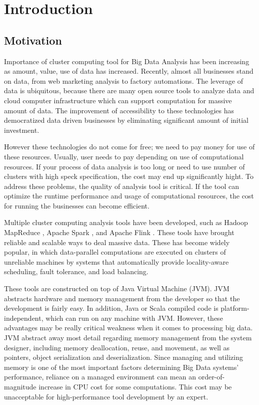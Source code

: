\chapter{Introduction}
\label{chapter:Introduction}
\thispagestyle{myheadings}


\section{Motivation}
\label{sec:motivation}
Importance of cluster computing tool for Big Data Analysis has been increasing as amount, value, use of data has increased. 
Recently, almost all businesses stand on data, from web marketing analysis to factory automations. The leverage of data is ubiquitous, because 
there are many open source tools to analyze data and cloud computer infrastructure which can support computation for massive amount of data. 
The improvement of accessibility to these technologies has democratized data driven businesses by 
eliminating significant amount of initial investment. 

However these technologies do not come for free; we need to pay money for use of these resources. Usually, user needs to pay depending on use of computational resources. 
If your process of data analysis is too long or need to use number of clusters with high speck specification, the cost may end up significantly hight.
To address these problems, the quality of analysis tool is critical. If the tool can optimize the runtime performance and usage of computational resources, 
the cost for running the businesses can become efficient.

Multiple cluster computing analysis tools have been developed, such as Hadoop MapReduce \cite{ApacheHadoopHomePage}, 
Apache Spark \cite{ApacheSparkHomePage}, and Apache Flink \cite{ApacheFlinkHomePage}. 
These tools have brought reliable and scalable ways to deal massive data. 
These has become widely popular, in which data-parallel computations are executed on clusters of unreliable machines by systems that automatically provide locality-aware scheduling, 
fault tolerance, and load balancing. 

These tools are constructed on top of Java Virtual Machine (JVM). JVM abstracts hardware and memory management from the developer so that the development is fairly easy. 
In addition, Java or Scala compiled code is platform-independent, which can run on any machine with JVM. However, these advantages may be really critical weakness when it comes to 
processing big data. JVM abstract away most detail regarding memory management from the system designer, including memory deallocation, reuse, and movement, as well as pointers, 
object serialization and deserialization. Since managing and utilizing memory is one of the most important factors determining Big Data systems' performance, 
reliance on a managed environment can mean an order-of-magnitude increase in CPU cost for some computations. This cost may be unacceptable for high-performance tool development by an expert.

